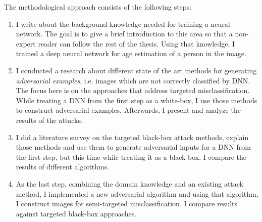 The methodological approach consists of the following steps:
\begin{enumerate}
    \item I write about the background knowledge needed for training a neural network. The goal is to give a brief introduction to this area so that a non-expert reader can follow the rest of the thesis. Using that knowledge, I trained a deep neural network for age estimation of a person in the image.
    
    \item I conducted a research about different state of the art methods for generating \textit{adversarial examples}, i.e. images which are not correctly classified by DNN. The focus here is on the approaches that address targeted misclassification. While treating a DNN from the first step as a white-box, I use those methods to construct adversarial examples. Afterwards, I present and analyze the results of the attacks.
    
    \item I did a literature survey on the targeted black-box attack methods, explain those methods and use them to generate adversarial inputs for a DNN  from the first step, but this time while treating it as a black box. I compare the results of different algorithms.
    
    \item As the last step, combining the domain knowledge and an existing attack method, I implemented a new adversarial algorithm and using that algorithm, I construct images for semi-targeted misclassification. I compare results against targeted black-box approaches.
\end{enumerate}
